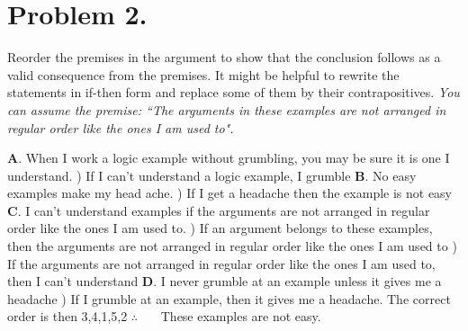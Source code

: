 \documentclass[11pt]{article}
\begin{document}
\section*{Problem 2.}

\noindent
Reorder the premises in the argument to show that the conclusion follows as
a valid consequence from the premises. It might be helpful to rewrite the
statements in if-then form and replace some of them by their contrapositives.
{\em You can assume the premise: ``The arguments in these examples are not arranged in regular order like the ones I am used to".}
\newline

{\bf A}. When I work a logic example without grumbling, you may be sure it is one I understand.
\newline
{}) If I can’t understand a logic example, I grumble
\newline
\newline
{\bf B}. No easy examples make my head ache.
\newline
{}) If I get a headache then the example is not easy
\newline
\newline
{\bf C}. I can't understand examples if the arguments are not arranged in regular order like the ones I am used to.
\newline
{}) If an argument belongs to these examples, then the arguments are not arranged in regular order like the ones I am used to
\newline
{})  If the arguments are not arranged in regular order like the ones I am used to, then I can’t understand
\newline
\newline
{\bf D}. I never grumble at an example unless it gives me a headache
\newline
{}) If I grumble at an example, then it gives me a headache.
\newline
\newline
\newline
\newline
The correct order is then 3,4,1,5,2
\newline
\newline
$\therefore$~~~ These examples are not easy.
\newline
\newline
\end{document}
